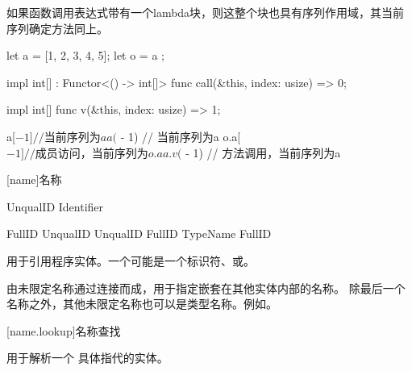 \pnum
如果函数调用表达式带有一个lambda块，则这整个块也具有序列作用域，其当前序列确定方法同上。

\enterexample

\begin{codeblock}
let a = [1, 2, 3, 4, 5];
let o = { a };

impl int[] : Functor<() -> int[]> {
    func call(&this, index: usize) => 0;
}

impl int[] {
    func v(&this, index: usize) => 1;
}

a[$ - 1] // 当前序列为a
a($ - 1) // 当前序列为a
o.a[$ - 1] // 成员访问，当前序列为o.a
a.v($ - 1) // 方法调用，当前序列为a

\end{codeblock}

\exitexample

[name]{名称}

\begin{bnf}{UnqualID}
    Identifier \br
     \br
\end{bnf}

\begin{bnf}{FullID}
    UnqualID \br
    UnqualID \terminal{::} FullID \br
    TypeName \terminal{::} FullID
\end{bnf}

\pnum
{}用于引用程序实体。一个可能是一个标识符、或。

\pnum
{}由未限定名称通过\tcode{::}连接而成，用于指定嵌套在其他实体内部的名称。
除最后一个名称之外，其他未限定名称也可以是类型名称。\enterexample 例如。\exitexample

[name.lookup]{名称查找}

\pnum
{}用于解析一个  具体指代的实体。
